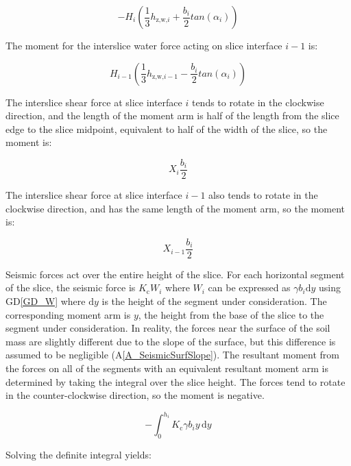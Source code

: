 \documentclass[12pt]{article}
\newcommand{\aref}[1]{A\ref{#1}}
\newcommand{\dref}[1]{GD\ref{#1}}
\begin{document}
\begin{equation*}
- H_{i} (\frac{1}{3} h_{\text{z,w,}i} + \frac{b_{i}}{2}tan(\alpha_{i}))
\end{equation*}

\noindent The moment for the interslice water force acting on slice interface 
$i-1$ is:

\begin{equation*}
H_{i-1} (\frac{1}{3} h_{\text{z,w,}i-1} - \frac{b_{i}}{2}tan(\alpha_{i}))
\end{equation*}

\noindent The interslice shear force at slice interface $i$ tends to rotate in 
the 
clockwise direction, and the length of the moment arm is half of the length 
from 
the slice edge to the slice midpoint, equivalent to half of the width of the 
slice, so the moment is:

\begin{equation*}
X_{i} \frac{b_{i}}{2}
\end{equation*}

\noindent The interslice shear force at slice interface $i-1$ also tends to 
rotate in 
the clockwise direction, and has the same length of the moment arm, so the 
moment is:

\begin{equation*}
X_{i-1} \frac{b_{i}}{2}
\end{equation*}

\noindent Seismic forces act over the entire height of the slice. For each 
horizontal segment of the slice, the seismic force is $K_\text{c}W_{i}$ where 
$W_{i}$ can be expressed as $\gamma b_{i} \mathrm{d}y$ using \dref{GD_W} where 
$\mathrm{d}y$ is the height of the segment under consideration. The 
corresponding moment arm is $y$, the height from the base of the slice to the 
segment under consideration. In reality, the forces near the surface of the 
soil mass are slightly different due to the slope of the surface, but this 
difference is assumed to be negligible (\aref{A_SeismicSurfSlope}). The 
resultant moment from the forces on all of the segments with an 
equivalent resultant moment arm is determined by taking the integral over the 
slice height. The forces tend to rotate in the counter-clockwise direction, so 
the moment is negative. 

\begin{equation*}
- \int_{0}^{h_{i}} K_{\text{c}} \gamma b_{i} y \,\mathrm{d}y
\end{equation*}

\noindent Solving the definite integral yields:
\end{document}
